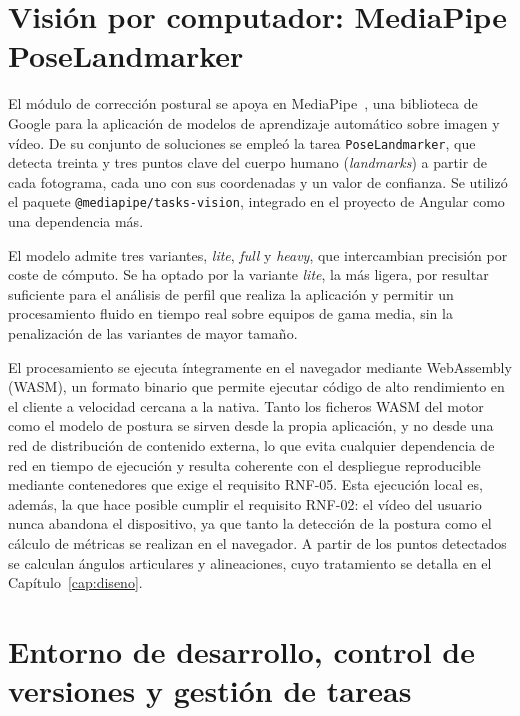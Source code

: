\documentclass[12pt,a4paper,twoside,openright]{book}
\begin{document}
    \section{Visión por computador: MediaPipe PoseLandmarker}

    El módulo de corrección postural se apoya en MediaPipe~\cite{mediapipe}, una biblioteca de
    Google para la aplicación de modelos de aprendizaje automático sobre
    imagen y vídeo. De su conjunto de soluciones se empleó la tarea
    \texttt{PoseLandmarker}, que detecta treinta y tres puntos clave del cuerpo
    humano (\textit{landmarks}) a partir de cada fotograma, cada uno con sus
    coordenadas y un valor de confianza. Se utilizó el paquete
    \texttt{@mediapipe/tasks-vision}, integrado en el proyecto de Angular como
    una dependencia más.

    El modelo admite tres variantes, \textit{lite}, \textit{full} y
    \textit{heavy}, que intercambian precisión por coste de cómputo. Se ha
    optado por la variante \textit{lite}, la más ligera, por resultar
    suficiente para el análisis de perfil que realiza la aplicación y permitir
    un procesamiento fluido en tiempo real sobre equipos de gama media, sin la
    penalización de las variantes de mayor tamaño.

    El procesamiento se ejecuta íntegramente en el navegador mediante
    WebAssembly (WASM), un formato binario que permite ejecutar código de alto
    rendimiento en el cliente a velocidad cercana a la nativa. Tanto los
    ficheros WASM del motor como el modelo de postura se sirven desde la propia
    aplicación, y no desde una red de distribución de contenido externa, lo que
    evita cualquier dependencia de red en tiempo de ejecución y resulta coherente
    con el despliegue reproducible mediante contenedores que exige el requisito
    RNF-05. Esta ejecución local es, además, la que hace posible cumplir el
    requisito RNF-02: el vídeo del usuario nunca abandona el dispositivo, ya que
    tanto la detección de la postura como el cálculo de métricas se realizan en el
    navegador. A partir de los puntos detectados se calculan ángulos articulares
    y alineaciones, cuyo tratamiento se detalla en el
    Capítulo~\ref{cap:diseno}.
    
    \section{Entorno de desarrollo, control de versiones y gestión de tareas}
    
\end{document}
